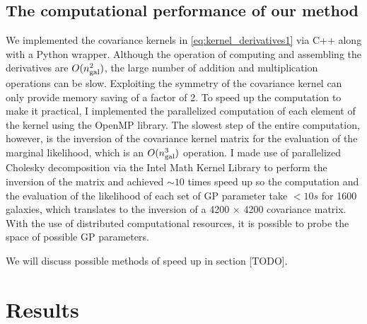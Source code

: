 \subsection{The computational performance of our method}
We implemented the covariance kernels in \ref{eq:kernel_derivatives1}
via {\sc C++} along with a {\sc Python} wrapper. 
Although the operation of computing and assembling the
derivatives are $O(n_{\rm gal}^2)$, the large number of addition and 
multiplication operations can be slow.
Exploiting the symmetry of the covariance kernel can only provide 
memory saving of a factor of 2.
To speed up the computation to make it practical, 
I implemented the parallelized computation of each element of the kernel using 
the {\sc OpenMP} library. The slowest step of the entire computation, however, 
is the inversion of the
covariance kernel matrix for the evaluation of the marginal likelihood, 
which is an $O(n_{\rm gal}^3)$ operation. 
I made use of parallelized Cholesky decomposition via the {\sc Intel Math
Kernel Library} to perform the inversion of the matrix and achieved $\sim10$ 
times speed up so the
computation and the evaluation of the likelihood of each set of GP parameter
take $< 10s$ for 1600 galaxies, which translates to 
the inversion of a 4200 $\times$ 4200 covariance matrix.
With the use of distributed computational resources, it is possible 
to probe the space of possible GP parameters.  


We will discuss possible methods
of speed up in section [TODO].

\section{Results}
 
